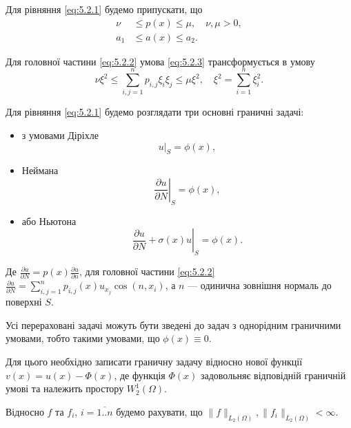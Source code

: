 Для рівняння \eqref{eq:5.2.1} будемо припускати, що 
\begin{align}
    \label{eq:5.2.3}
    \nu &\le p(x) \le \mu, \quad \nu, \mu > 0, \\
    \label{eq:5.2.3'}
    a_1 &\le a(x) \le a_2.
\end{align}

Для головної частини \eqref{eq:5.2.2} умова \eqref{eq:5.2.3} трансформується в умову
\begin{equation}
    \label{eq:5.2.3''}
    \nu \xi^2 \le \sum_{i,j=1}^n p_{i,j} \xi_i \xi_j \le \mu \xi^2, \quad \xi^2 = \sum_{i = 1}^n \xi_i^2.
\end{equation}

Для рівняння \eqref{eq:5.2.1} будемо розглядати три основні граничні задачі:
\begin{itemize}
    \item з умовами Діріхле
    \begin{equation}
        \label{eq:5.2.4}
        \left. u \right|_S = \phi(x), 
    \end{equation}
    \item Неймана
    \begin{equation}
        \label{eq:5.2.5}
        \left. \frac{\partial u}{\partial N} \right|_S = \phi(x), 
    \end{equation}
    \item або Ньютона
    \begin{equation}
        \label{eq:5.2.6}
        \left. \frac{\partial u}{\partial N} + \sigma(x) u \right|_S = \phi(x).
    \end{equation}
\end{itemize}

Де $\frac{\partial u}{\partial N} = p(x) \frac{\partial u}{\partial n}$, для головної частини \eqref{eq:5.2.2} $\frac{\partial u}{\partial N} = \sum_{i,j=1}^n p_{i,j}(x) u_{x_j} \cos (n, x_i)$, а $n$ --- одинична зовнішня нормаль до поверхні $S$. \medskip

Усі перераховані задачі можуть бути зведені до задач з однорідним граничними умовами, тобто такими умовами, що $\phi(x) \equiv 0$. \meskip

Для цього необхідно записати граничну задачу відносно нової функції $v(x) = u(x) - \Phi(x)$, де функція $\Phi(x)$ задовольняє відповідній граничній умові та належить простору $W_2^1(\Omega)$. \medskip

Відносно $f$ та $f_i$, $i = \overline{1..n}$ будемо рахувати, що $\|f\|_{L_2(\Omega)}, \|f_i\|_{L_2(\Omega)} < \infty$. \medskip

